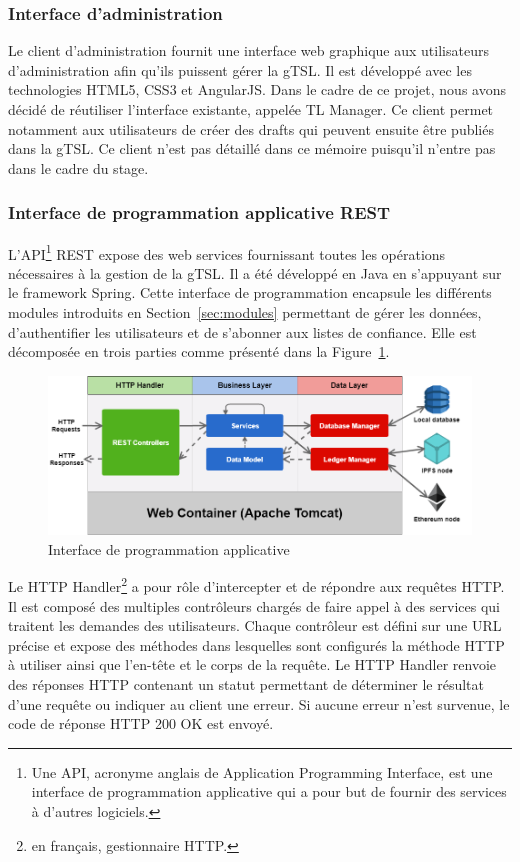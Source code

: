\documentclass{tnreport}
\begin{document}
\subsubsection{Interface d'administration}

Le client d'administration fournit une interface web graphique aux utilisateurs d'administration afin qu'ils puissent gérer la gTSL. Il est développé avec les technologies HTML5, CSS3 et AngularJS. Dans le cadre de ce projet, nous avons décidé de réutiliser l'interface existante, appelée TL Manager. Ce client permet notamment aux utilisateurs de créer des drafts qui peuvent ensuite être publiés dans la gTSL. Ce client n'est pas détaillé dans ce mémoire puisqu'il n'entre pas dans le cadre du stage.

\subsubsection{Interface de programmation applicative REST}

L'API\footnote{Une API, acronyme anglais de Application Programming Interface, est une interface de programmation applicative qui a pour but de fournir des services à d'autres logiciels.} REST expose des web services fournissant toutes les opérations nécessaires à la gestion de la gTSL. Il a été développé en Java en s'appuyant sur le framework Spring. Cette interface de programmation encapsule les différents modules introduits en Section~\ref{sec:modules} permettant de gérer les données, d'authentifier les utilisateurs et de s'abonner aux listes de confiance. Elle est décomposée en trois parties comme présenté dans la Figure~\ref{fig:rest-api}.

\begin{figure}[h]
	\centering
	\includegraphics[scale=0.52]{figures/rest-api}
	\caption{Interface de programmation applicative}
	\label{fig:rest-api}
\end{figure}

Le HTTP Handler\footnote{en français, gestionnaire HTTP.} a pour rôle d'intercepter et de répondre aux requêtes HTTP. Il est composé des multiples contrôleurs chargés de faire appel à des services qui traitent les demandes des utilisateurs. Chaque contrôleur est défini sur une URL précise et expose des méthodes dans lesquelles sont configurés la méthode HTTP à utiliser ainsi que l'en-tête et le corps de la requête. Le HTTP Handler renvoie des réponses HTTP contenant un statut permettant de déterminer le résultat d'une requête ou indiquer au client une erreur. Si aucune erreur n'est survenue, le code de réponse HTTP 200 OK est envoyé.
\end{document}
